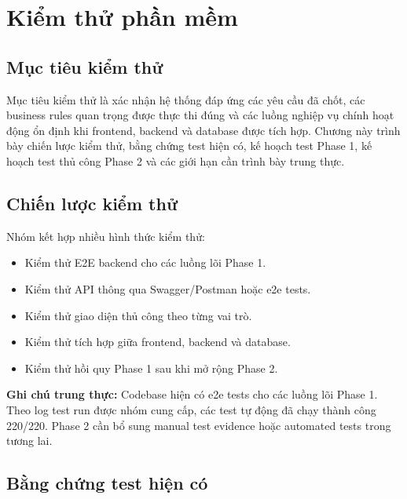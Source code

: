\chapter{Kiểm thử phần mềm}

\section{Mục tiêu kiểm thử}

Mục tiêu kiểm thử là xác nhận hệ thống đáp ứng các yêu cầu đã chốt, các business rules quan trọng được thực thi đúng và các luồng nghiệp vụ chính hoạt động ổn định khi frontend, backend và database được tích hợp. Chương này trình bày chiến lược kiểm thử, bằng chứng test hiện có, kế hoạch test Phase 1, kế hoạch test thủ công Phase 2 và các giới hạn cần trình bày trung thực.

\section{Chiến lược kiểm thử}

Nhóm kết hợp nhiều hình thức kiểm thử:

\begin{itemize}
    \item Kiểm thử E2E backend cho các luồng lõi Phase 1.
    \item Kiểm thử API thông qua Swagger/Postman hoặc e2e tests.
    \item Kiểm thử giao diện thủ công theo từng vai trò.
    \item Kiểm thử tích hợp giữa frontend, backend và database.
    \item Kiểm thử hồi quy Phase 1 sau khi mở rộng Phase 2.
\end{itemize}


\textbf{Ghi chú trung thực:} Codebase hiện có e2e tests cho các luồng lõi Phase 1. Theo log test run được nhóm cung cấp, các test tự động đã chạy thành công 220/220. Phase 2 cần bổ sung manual test evidence hoặc automated tests trong tương lai.

\section{Bằng chứng test hiện có}

